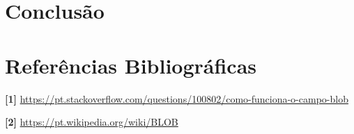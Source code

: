 \documentclass[12pt,a4paper]{article}
\begin{document}








\section{Conclusão}



\section{Referências Bibliográficas}
\noindent \textbf{[1]} \url {https://pt.stackoverflow.com/questions/100802/como-funciona-o-campo-blob}\\\vspace{0.2cm}

\noindent \textbf{[2] }\url{https://pt.wikipedia.org/wiki/BLOB}\\\vspace{0.2cm}
\end{document}
